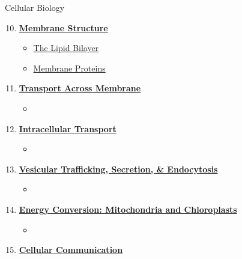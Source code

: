 \documentclass[12pt,letterpaper]{article}
\begin{document}

\begin{chapbox}{Cellular Biology}{ 
\begin{enumerate}[font=\bfseries, wide]
    \setcounter{enumi}{9}
    \item \hyperlink{10}{\textbf{Membrane Structure}}
    \begin{itemize}
        \item \hyperlink{10.1}{The Lipid Bilayer}
        \item \hyperlink{10.2}{Membrane Proteins}
    \end{itemize}
    \item \hyperlink{11}{\textbf{Transport Across Membrane}}
    \begin{itemize}
        \item
    \end{itemize}
    \item \hyperlink{12}{\textbf{Intracellular Transport}}
    \begin{itemize}
        \item 
    \end{itemize}
    \item \hyperlink{13}{\textbf{Vesicular Trafficking, Secretion, \& Endocytosis}}
    \begin{itemize}
        \item
    \end{itemize}
    \item \hyperlink{14}{\textbf{Energy Conversion: Mitochondria and Chloroplasts}}
    \begin{itemize}
        \item 
    \end{itemize}
    \item \hyperlink{15}{\textbf{Cellular Communication}}

\end{enumerate}}
\end{chapbox}
\end{document}
